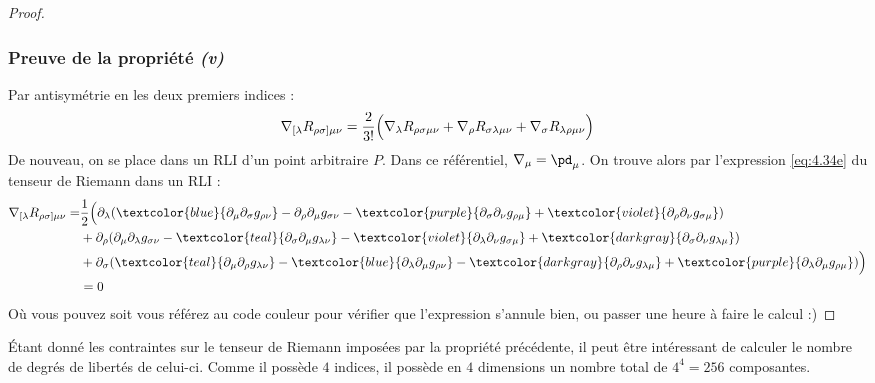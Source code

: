 \begin{proof}
    \subsubsection{Preuve de la propriété \emph{(v)}}
        Par antisymétrie en les deux premiers indices :
        \begin{equation}
            \nabla_{[\lambda}R_{\rho \sigma]\mu \nu} = \frac{2}{3!} \Bigl(\nabla_{\lambda}R_{\rho \sigma \mu \nu} + \nabla_{\rho}R_{\sigma \lambda \mu \nu} + \nabla_{\sigma}R_{\lambda \rho \mu \nu}\Bigr)
        \end{equation}
        De nouveau, on se place dans un RLI d'un point arbitraire $P$. Dans ce référentiel, $\nabla_\mu = \pd_\mu$. On trouve alors par l'expression \ref{eq:4.34e} du tenseur de Riemann dans un RLI :
        \begin{align}
            \nabla_{[\lambda}R_{\rho \sigma]\mu \nu} =& \frac{1}{2}\Bigl(\partial_{\lambda}(\textcolor{blue}{\partial_{\mu}\partial_{\sigma}g_{\rho \nu}} - \partial_{\rho}\partial_{\mu}g_{\sigma \nu} - \textcolor{purple}{\partial_{\sigma}\partial_{\nu}g_{\rho \mu}} + \textcolor{violet}{\partial_{\rho}\partial_{\nu}g_{\sigma \mu}}) \\
            &+ \partial_{\rho}(\partial_{\mu}\partial_{\lambda}g_{\sigma \nu} - \textcolor{teal}{\partial_{\sigma}\partial_{\mu}g_{\lambda \nu}} - \textcolor{violet}{\partial_{\lambda}\partial_{\nu}g_{\sigma \mu} }
            + \textcolor{darkgray}{\partial_{\sigma}\partial_{\nu}g_{\lambda \mu}}) \\
            &+\partial_{\sigma}(\textcolor{teal}{\partial_{\mu}\partial_{\rho}g_{\lambda \nu}} - \textcolor{blue}{\partial_{\lambda}\partial_{\mu}g_{\rho \nu}} - \textcolor{darkgray}{\partial_{\rho}\partial_{\nu}g_{\lambda \mu}} + \textcolor{purple}{\partial_{\lambda}\partial_{\mu}g_{\rho \mu}})\Bigr)\\
            &=0
        \end{align}
        Où vous pouvez soit vous référez au code couleur pour vérifier que l'expression s'annule bien, ou passer une heure à faire le calcul :)
\end{proof}
Étant donné les contraintes sur le tenseur de Riemann imposées par la propriété précédente, il peut être intéressant de calculer le nombre de degrés de libertés de celui-ci. Comme il possède $4$ indices, il possède en $4$ dimensions un nombre total de $4^4 = 256$ composantes. 

